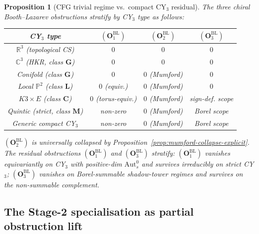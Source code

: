 \documentclass[11pt]{amsart}
\newtheorem{proposition}[theorem]{Proposition}
\newcommand{\bP}{\mathbb{P}}
\newcommand{\bC}{\mathbb{C}}
\newcommand{\bR}{\mathbb{R}}
\newcommand{\Aut}{\mathrm{Aut}}
\begin{document}
\begin{proposition}[CFG trivial regime vs.\ compact CY$_3$ residual]
\label{prop:cfg-vs-compact}
The three chiral Booth--Lazarev obstructions stratify by CY$_3$
type as follows:
\begin{center}
\begin{tabular}{|c|c|c|c|}
\hline
CY$_3$ type & $(\mathbf{O}_1^{\mathrm{BL}})$ & $(\mathbf{O}_2^{\mathrm{BL}})$ & $(\mathbf{O}_3^{\mathrm{BL}})$ \\
\hline
$\bR^3$ (topological CS) & $0$ & $0$ & $0$ \\
$\bC^3$ (HKR, class $\mathbf{G}$) & $0$ & $0$ & $0$ \\
Conifold (class $\mathbf{G}$) & $0$ & $0$ (Mumford) & $0$ \\
Local $\bP^2$ (class $\mathbf{L}$) & $0$ (equiv.) & $0$ (Mumford) & $0$ \\
$K3\times E$ (class $\mathbf{C}$) & $0$ (torus-equiv.) & $0$ (Mumford) & sign-def. scope \\
Quintic (strict, class $\mathbf{M}$) & \emph{non-zero} & $0$ (Mumford) & Borel scope \\
Generic compact CY$_3$ & \emph{non-zero} & $0$ (Mumford) & Borel scope \\
\hline
\end{tabular}
\end{center}
$(\mathbf{O}_2^{\mathrm{BL}})$ is universally collapsed by
Proposition~\ref{prop:mumford-collapse-explicit}. The residual
obstructions $(\mathbf{O}_1^{\mathrm{BL}})$ and
$(\mathbf{O}_3^{\mathrm{BL}})$ stratify: $(\mathbf{O}_1^{\mathrm{BL}})$
vanishes equivariantly on CY$_3$ with positive-dim $\Aut^0_s$ and
survives irreducibly on strict CY$_3$; $(\mathbf{O}_3^{\mathrm{BL}})$
vanishes on Borel-summable shadow-tower regimes and survives on
the non-summable complement.
\end{proposition}

\subsection{The Stage-2 specialisation as partial obstruction lift}
\end{document}
